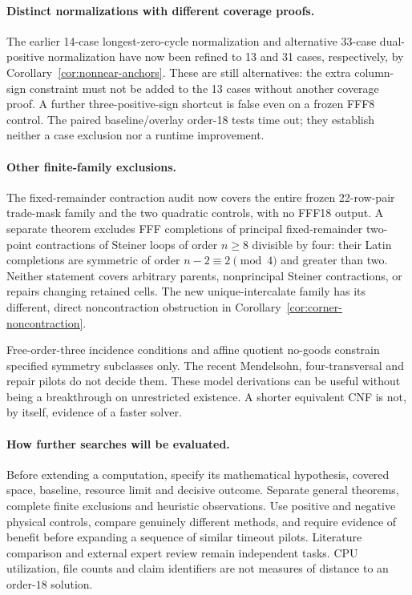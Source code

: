 \paragraph{Distinct normalizations with different coverage proofs.}
The earlier 14-case longest-zero-cycle normalization and alternative
33-case dual-positive normalization have now been refined to 13 and
31 cases, respectively, by Corollary~\ref{cor:nonnear-anchors}.
These are still alternatives: the extra column-sign constraint must not
be added to the 13 cases without another coverage proof. A further
three-positive-sign shortcut is false even on a frozen FFF8 control.
The paired baseline/overlay order-18 tests time out; they establish
neither a case exclusion nor a runtime improvement.

\paragraph{Other finite-family exclusions.}
The fixed-remainder contraction audit now covers the entire frozen
22-row-pair trade-mask family and the two quadratic controls, with
no FFF18 output. A separate theorem excludes FFF completions of principal
fixed-remainder two-point contractions of Steiner loops of order
$n\geq8$ divisible by four: their Latin completions are symmetric
of order $n-2\equiv2\pmod4$ and greater than two. Neither statement covers arbitrary
parents, nonprincipal Steiner contractions, or repairs changing
retained cells. The new unique-intercalate family has its different,
direct noncontraction obstruction in Corollary~\ref{cor:corner-noncontraction}.

Free-order-three incidence conditions and affine quotient no-goods
constrain specified symmetry subclasses only. The recent Mendelsohn,
four-transversal and repair pilots do not decide them. These model
derivations can be useful without being a breakthrough on unrestricted
existence. A shorter equivalent CNF is not, by itself, evidence of
a faster solver.

\paragraph{How further searches will be evaluated.}
Before extending a computation, specify its mathematical hypothesis,
covered space, baseline, resource limit and decisive outcome. Separate
general theorems, complete finite exclusions and heuristic observations.
Use positive and negative physical controls, compare genuinely different
methods, and require evidence of benefit before expanding a sequence
of similar timeout pilots. Literature comparison and external expert
review remain independent tasks. CPU utilization, file counts and
claim identifiers are not measures of distance to an order-$18$ solution.

